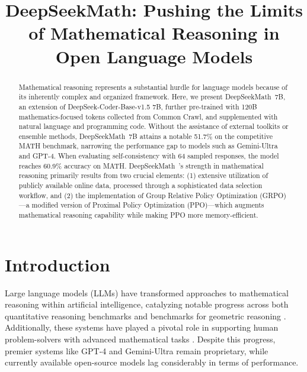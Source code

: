 \title{DeepSeekMath: Pushing the Limits of Mathematical Reasoning in Open Language Models}

\begin{abstract}
Mathematical reasoning represents a substantial hurdle for language models because of its inherently complex and organized framework. Here, we present DeepSeekMath~7B, an extension of DeepSeek-Coder-Base-v1.5 7B, further pre-trained with 120B mathematics-focused tokens collected from Common Crawl, and supplemented with natural language and programming code. Without the assistance of external toolkits or ensemble methods, DeepSeekMath~7B attains a notable 51.7\% on the competitive MATH benchmark, narrowing the performance gap to models such as Gemini-Ultra and GPT-4. When evaluating self-consistency with 64 sampled responses, the model reaches 60.9\% accuracy on MATH. DeepSeekMath~’s strength in mathematical reasoning primarily results from two crucial elements: (1) extensive utilization of publicly available online data, processed through a sophisticated data selection workflow, and (2) the implementation of Group Relative Policy Optimization (GRPO)—a modified version of Proximal Policy Optimization (PPO)—which augments mathematical reasoning capability while making PPO more memory-efficient.
\end{abstract}

\section{Introduction}

Large language models (LLMs) have transformed approaches to mathematical reasoning within artificial intelligence, catalyzing notable progress across both quantitative reasoning benchmarks \citep{MATH} and benchmarks for geometric reasoning \citep{trinh2024solving}. Additionally, these systems have played a pivotal role in supporting human problem-solvers with advanced mathematical tasks \citep{tao}. Despite this progress, premier systems like GPT-4 \citep{gpt4} and Gemini-Ultra \citep{gemini} remain proprietary, while currently available open-source models lag considerably in terms of performance.

